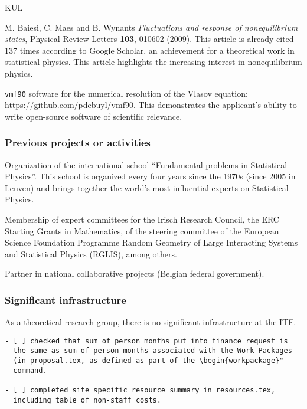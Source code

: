 \begin{sitedescription}{KUL}
\begin{compactenum}
\item M. Baiesi, C. Maes and B. Wynants {\em Fluctuations and response of nonequilibrium
  states}, Physical Review Letters {\bf 103}, 010602 (2009). This article is already cited
137 times according to Google Scholar, an achievement for a theoretical work in statistical
physics. This article highlights the increasing interest in nonequilibrium physics.
\item {\tt vmf90} software for the numerical resolution of the Vlasov equation:
\url{https://github.com/pdebuyl/vmf90}. This demonstrates the applicant's ability to write
open-source software of scientific relevance.
\end{compactenum}


\subsubsection*{Previous projects or activities}

\begin{compactenum}
\item Organization of the international school ``Fundamental problems in Statistical
Physics''.
%
This school is organized every four years since the 1970s (since 2005 in Leuven) and brings
together the world's most influential experts on Statistical Physics.
\item Membership of expert committees for the Irisch Research Council, the ERC Starting
Grants in Mathematics, of the steering committee of the European Science Foundation
Programme Random Geometry of Large Interacting Systems and Statistical Physics (RGLIS),
among others.
\item Partner in national collaborative projects (Belgian federal government).
\end{compactenum}

\subsubsection*{Significant infrastructure}

As a theoretical research group, there is no significant infrastructure at the ITF.

\end{sitedescription}



\begin{draft}
\vspace{1cm}

\begin{verbatim}
- [ ] checked that sum of person months put into finance request is
  the same as sum of person months associated with the Work Packages
  (in proposal.tex, as defined as part of the \begin{workpackage}"
  command.
  
- [ ] completed site specific resource summary in resources.tex,
  including table of non-staff costs.

\end{verbatim}
\end{draft}

